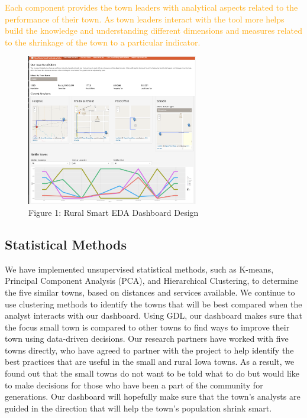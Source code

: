 \documentclass[10pt]{article}\usepackage[]{graphicx}\usepackage[]{color}
\newcommand{\db}[1]{{\textcolor{orange}{#1}}}
\begin{document}
\db{ Each component provides the town leaders with analytical aspects related to the performance of their town. As town leaders interact with the tool more helps build the knowledge and understanding different dimensions and measures related to the shrinkage of the town to a particular indicator.}

\begin{figure}[ht!]
\centering
\includegraphics[width=75mm]{SCC_Dashboard_pcp2.png}
\caption{Figure 1: Rural Smart EDA Dashboard Design}
\end{figure}

\subsection{Statistical Methods}
We have implemented unsupervised statistical methods, such as K-means, Principal Component Analysis (PCA), and Hierarchical Clustering, to determine the five similar towns, based on distances and services available. We continue to use clustering methods to identify the towns that will be best compared when the analyst interacts with our dashboard. Using GDL, our dashboard makes sure that the focus small town is compared to other towns to find ways to improve their town using data-driven decisions. Our research partners have worked with five towns directly, who have agreed to partner with the project to help identify the best practices that are useful in the small and rural Iowa towns. As a result, we found out that the small towns do not want to be told what to do but would like to make decisions for those who have been a part of the community for generations. Our dashboard will hopefully make sure that the town's analysts are guided in the direction that will help the town's population shrink smart. 

\end{document}

